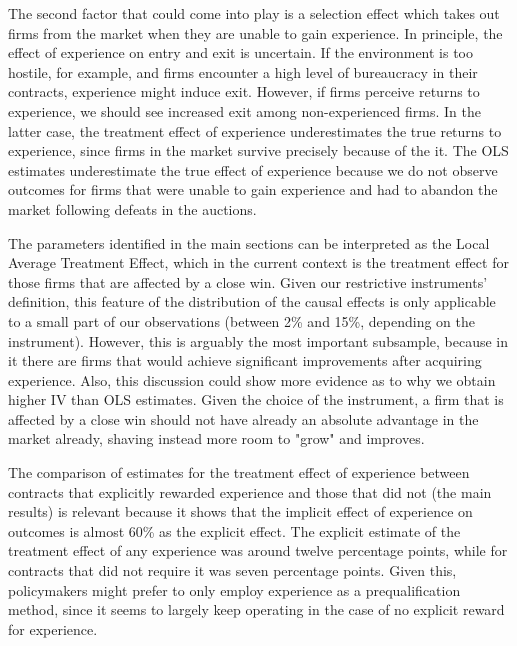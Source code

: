 The second factor that could come into play is a selection effect which takes out firms from the market when they are unable to gain experience. In principle, the effect of experience on entry and exit is uncertain. If the environment is too hostile, for example, and firms encounter a high level of bureaucracy in their contracts, experience might induce exit. However, if firms perceive returns to experience, we should see increased exit among non-experienced firms. In the latter case, the treatment effect of experience underestimates the true returns to experience, since firms in the market survive precisely because of the it.  The OLS estimates underestimate the true effect of experience because we do not observe outcomes for firms that were unable to gain experience and had to abandon the market following defeats in the auctions. %


The parameters identified in the main sections can be interpreted  as the Local Average Treatment Effect, which in the current context is the treatment effect for those firms that are affected by a close win. Given our restrictive instruments' definition, this feature of the distribution of the causal effects is only applicable to a small part of our observations (between 2\% and 15\%, depending on the instrument). However, this is arguably the most important subsample, because in it there are firms that would achieve significant improvements after acquiring experience. Also, this discussion could show more evidence as to why we obtain higher IV than OLS estimates. Given the choice of the instrument, a firm that is affected by a close win should not have already an absolute advantage in the market already, shaving instead more room to "grow" and improves.

The comparison of estimates for the treatment effect of experience between contracts that explicitly rewarded experience and those that did not (the main results) is relevant because it shows that the implicit effect of experience on outcomes is almost 60\% as the explicit effect. The explicit estimate of the treatment effect of any experience was around twelve percentage points, while for contracts that did not require it was seven percentage points. Given this, policymakers might prefer to only employ experience as a prequalification method, since it seems to largely keep operating in the case of no explicit reward for experience.

